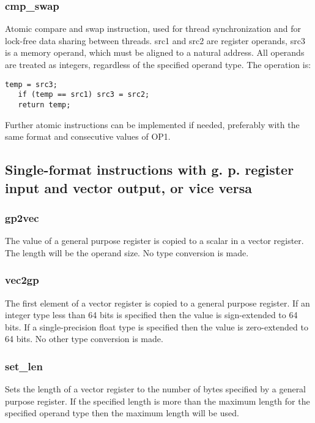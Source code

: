 \documentclass[forwardcom.tex]{subfiles}
\begin{document}
\subsubsection{cmp\_swap}
Atomic compare and swap instruction, used for thread synchronization and for lock-free data sharing between threads. src1 and src2 are register operands, src3 is a memory operand, which must be aligned to a natural address. All operands are treated as integers, regardless of the specified operand type. The operation is:

\begin{lstlisting}[frame=none]
   temp = src3;
   if (temp == src1) src3 = src2;
   return temp;
\end{lstlisting}

Further atomic instructions can be implemented if needed, preferably with the same format and consecutive values of OP1.

\subsection{Single-format instructions with g. p. register input and vector output, or vice versa}

\subsubsection{gp2vec}
The value of a general purpose register is copied to a scalar in a vector register. The length will be the operand size. No type conversion is made.

\subsubsection{vec2gp}
The first element of a vector register is copied to a general purpose register. If an integer type less than 64 bits is specified then the value is sign-extended to 64 bits. If a single-precision float type is specified then the value is zero-extended to 64 bits. No other type conversion is made.

\subsubsection{set\_len}
Sets the length of a vector register to the number of bytes specified by a general purpose register. If the specified length is more than the maximum length for the specified operand type then the maximum length will be used.
\vspace{2mm}
\end{document}
